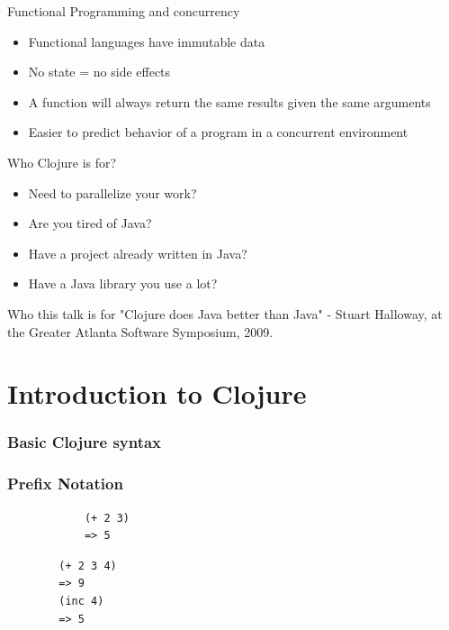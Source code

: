 \documentclass[xcolor=dvipsnames]{beamer}
\begin{document}
	\begin{frame}{Functional Programming and concurrency}
		\begin{itemize}
		\item Functional languages have immutable data
		\item No state = no side effects
		\item A function will always return the same results given the same arguments
		\item Easier to predict behavior of a program in a concurrent environment
		\end{itemize}
	\end{frame}
	
	\begin{frame}{Who Clojure is for?}
			\begin{itemize}
				\item Need to parallelize your work?
				\item Are you tired of Java?
		\pause
				\item Have a project already written in Java?
				\item Have a Java library you use a lot?
			\end{itemize}
	\end{frame}
	
	\begin{frame}{Who this talk is for}
	"Clojure does Java better than Java" - Stuart Halloway, at the Greater Atlanta Software Symposium, 2009.
	\end{frame}
		
	\begin{frame}
		\tableofcontents
	\end{frame}
	
	\section{Introduction to Clojure}
		\subsubsection{Basic Clojure syntax}
		\begin{frame}[fragile]
		\frametitle{Prefix Notation}
		\begin{verbatim}
			(+ 2 3)
			=> 5
		\end{verbatim}
		\pause
		\begin{verbatim}
		(+ 2 3 4)
		=> 9
		(inc 4)
		=> 5
		\end{verbatim}
		\end{frame}
		
\end{document}

